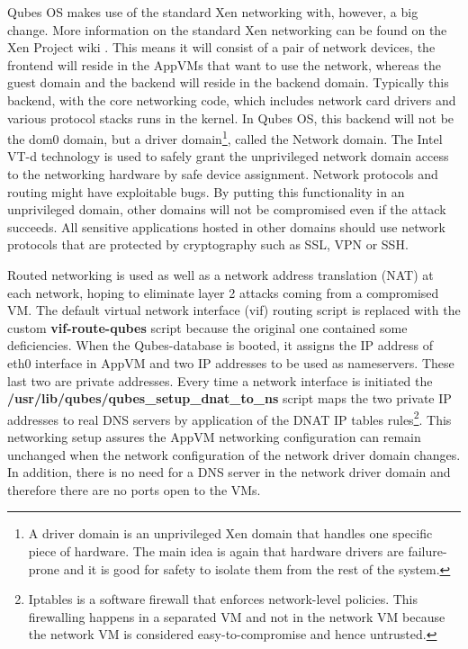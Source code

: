 \documentclass[runningheads,a4paper]{article}
\begin{document}
Qubes OS makes use of the standard Xen networking with, however, a big
change. More information on the standard Xen networking can be found
on the Xen Project wiki \cite{XenNetworking}. This means it will
consist of a pair of network devices, the frontend will reside in the
AppVMs that want to use the network, whereas the guest domain and the
backend will reside in the backend domain. Typically this backend,
with the core networking code, which includes network card
drivers and various protocol stacks runs in the kernel. In Qubes OS,
this backend will not be the dom0 domain, but a driver
domain\footnote{A driver domain is an unprivileged Xen domain that
handles one specific piece of hardware. The main idea is again that
hardware drivers are failure-prone and it is good for safety to
isolate them from the rest of the system.}, called the Network
domain. The Intel VT-d technology is used to safely grant the
unprivileged network domain access to the networking hardware by safe
device assignment. Network protocols and routing might have
exploitable bugs. By putting this functionality in an unprivileged
domain, other domains will not be compromised even if the attack
succeeds. All sensitive applications hosted in other domains should
use network protocols that are protected by cryptography such as SSL,
VPN or SSH.

Routed networking is used as well as a network address translation (NAT)
at each network, hoping to eliminate layer 2 attacks coming from a
compromised VM. The default virtual network interface (vif) routing
script is replaced with the custom \textbf{vif-route-qubes} script
because the original one contained some deficiencies. When the
Qubes-database is booted, it assigns the IP address of eth0 interface
in AppVM and two IP addresses to be used as nameservers. These last
two are private addresses. Every time a network interface is
initiated the \textbf{/usr/lib/qubes/qubes\_setup\_dnat\_to\_ns} script
maps the two private IP addresses to real DNS servers by application
of the DNAT IP tables rules\footnote{Iptables is a software firewall that
enforces network-level policies. This firewalling happens in a
separated VM and not in the network VM because the network VM is
considered easy-to-compromise and hence untrusted.}. This networking
setup assures the AppVM networking configuration can remain unchanged
when the network configuration of the network driver domain
changes. In addition, there is no need for a DNS server in the network
driver domain and therefore there are no ports open to the VMs.
\end{document}
